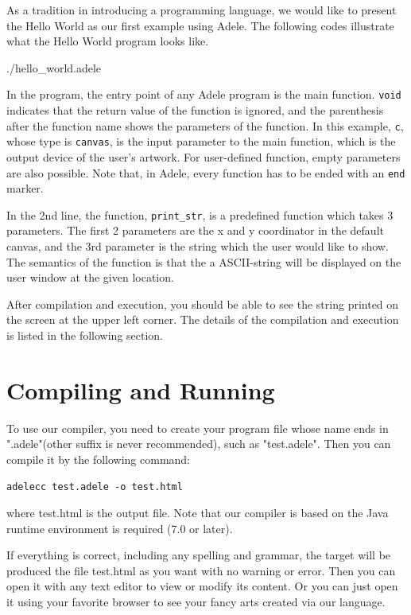 \documentclass[11pt,letterpaper]{article}
\begin{document}
As a tradition in introducing a programming language, we would like to present the Hello World as our first example using Adele. The following codes illustrate what the Hello World program looks like.

 {./hello_world.adele}

In the program, the entry point of any Adele program is the main function. \texttt{void} indicates that the return value of the function is ignored, and the parenthesis after the function name shows the parameters of the function. In this example, \texttt{c}, whose type is \texttt{canvas}, is the input parameter to the main function, which is the output device of the user's artwork. For user-defined function, empty parameters are also possible. Note that, in Adele, every function has to be ended with an \texttt{end} marker.

In the 2nd line, the function, \texttt{print\_str}, is a predefined function which takes 3 parameters. The first 2 parameters are the x and y coordinator in the default canvas, and the 3rd parameter is the string which the user would like to show. The semantics of the function is that the a ASCII-string will be displayed on the user window at the given location.

After compilation and execution, you should be able to see the string printed on the screen at the upper left corner. The details of the compilation and execution is listed in the following section.

\section {Compiling and Running}
To use our compiler, you need to create your program file whose name ends in ".adele"(other suffix is never recommended), such as "test.adele". Then you can compile it by the following command:

\begin{lstlisting}[tabsize=4]
	adelecc test.adele -o test.html
\end{lstlisting}

where test.html is the output file. Note that our compiler is based on the Java runtime environment is required (7.0 or later).

If everything is correct, including any spelling and grammar, the target will be produced the file test.html as you want with no warning or error. Then you can open it with any text editor to view or modify its content. Or you can just open it using your favorite browser to see your fancy arts created via our language.
\end{document}
